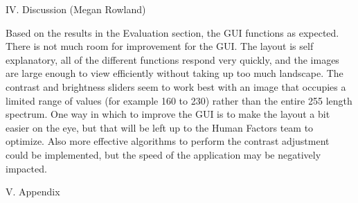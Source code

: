 \documentclass{article}
\begin{document}
\begin{multicols*}{2}
\vspace{15 pt}



\begin{center}
{\large IV. Discussion (Megan Rowland)}
\end{center}

Based on the results in the Evaluation section, the GUI functions as expected. There is not much room for improvement for the GUI. The layout is self explanatory, all of the different functions respond very quickly, and the images are large enough to view efficiently without taking up too much landscape. 
The contrast and brightness sliders seem to work best with an image that occupies a limited range of values (for example 160 to 230) rather than the entire 255 length spectrum.
One way in which to improve the GUI is to make the layout a bit easier on the eye, but that will be left up to the Human Factors team to optimize. Also more effective algorithms to perform the contrast adjustment could be implemented, but the speed of the application may be negatively impacted. 



\begin{center}
{\large V. Appendix}
\end{center}

\end{multicols*}













\end{document}

